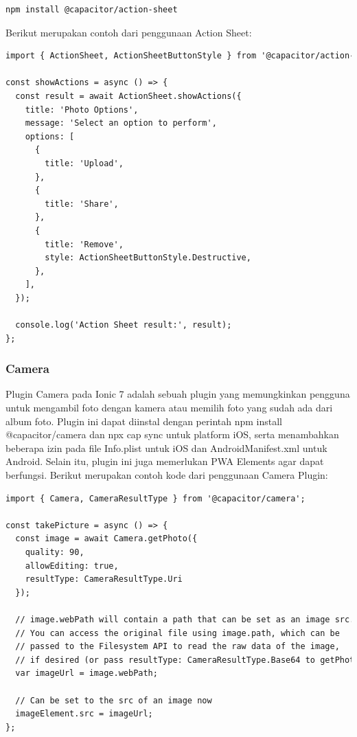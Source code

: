 \begin{lstlisting}[language=HTML, caption=Kode untuk menginstal Plugin Action Sheet, label=kode:install-action-sheet-capacitor]
npm install @capacitor/action-sheet
\end{lstlisting}

Berikut merupakan contoh dari penggunaan Action Sheet:

\begin{lstlisting}[language=HTML, caption=Contoh kode plugin Action Sheet, label=kode:capacitor-action-sheet-example]
import { ActionSheet, ActionSheetButtonStyle } from '@capacitor/action-sheet';

const showActions = async () => {
  const result = await ActionSheet.showActions({
    title: 'Photo Options',
    message: 'Select an option to perform',
    options: [
      {
        title: 'Upload',
      },
      {
        title: 'Share',
      },
      {
        title: 'Remove',
        style: ActionSheetButtonStyle.Destructive,
      },
    ],
  });

  console.log('Action Sheet result:', result);
};
\end{lstlisting}

\subsubsection{Camera}
Plugin Camera pada Ionic 7 adalah sebuah plugin yang memungkinkan pengguna untuk mengambil foto dengan kamera atau memilih foto yang sudah ada dari album foto. Plugin ini dapat diinstal dengan perintah npm install @capacitor/camera dan npx cap sync untuk platform iOS, serta menambahkan beberapa izin pada file Info.plist untuk iOS dan AndroidManifest.xml untuk Android. Selain itu, plugin ini juga memerlukan PWA Elements agar dapat berfungsi. Berikut merupakan contoh kode dari penggunaan Camera Plugin:

\begin{lstlisting}[language=HTML, caption=Contoh kode Capacitor Camera, label=kode:capacitor-cam-example]
import { Camera, CameraResultType } from '@capacitor/camera';

const takePicture = async () => {
  const image = await Camera.getPhoto({
    quality: 90,
    allowEditing: true,
    resultType: CameraResultType.Uri
  });

  // image.webPath will contain a path that can be set as an image src.
  // You can access the original file using image.path, which can be
  // passed to the Filesystem API to read the raw data of the image,
  // if desired (or pass resultType: CameraResultType.Base64 to getPhoto)
  var imageUrl = image.webPath;

  // Can be set to the src of an image now
  imageElement.src = imageUrl;
};
\end{lstlisting}

